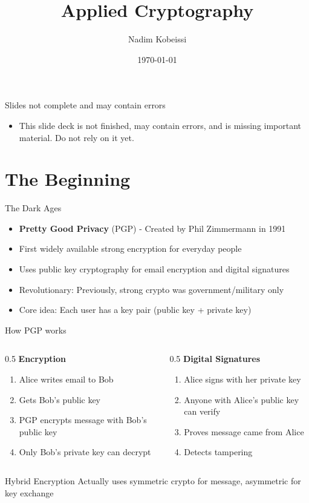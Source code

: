 \documentclass[aspectratio=169, lualatex, handout]{beamer}
\title{Applied Cryptography}
\author{Nadim Kobeissi}
\institute{American University of Beirut}
\date{\today}
\begin{document}
\begin{frame}[plain]
	\titlepage
\end{frame}

\begin{frame}{Slides not complete and may contain errors}
	\begin{itemize}
		\item This slide deck is not finished, may contain errors, and is missing important material. Do not rely on it yet.
	\end{itemize}
\end{frame}

\section{The Beginning}
\begin{frame}{The Dark Ages}
	\begin{itemize}
		\item \textbf{Pretty Good Privacy} (PGP) - Created by Phil Zimmermann in 1991
		\item First widely available strong encryption for everyday people
		\item Uses public key cryptography for email encryption and digital signatures
		\item Revolutionary: Previously, strong crypto was government/military only
		\item Core idea: Each user has a key pair (public key + private key)
	\end{itemize}
\end{frame}

\begin{frame}{How PGP works}
	\begin{columns}
		\begin{column}{0.5\textwidth}
			\textbf{Encryption}
			\begin{enumerate}
				\item Alice writes email to Bob
				\item Gets Bob's public key
				\item PGP encrypts message with Bob's public key
				\item Only Bob's private key can decrypt
			\end{enumerate}
		\end{column}
		\begin{column}{0.5\textwidth}
			\textbf{Digital Signatures}
			\begin{enumerate}
				\item Alice signs with her private key
				\item Anyone with Alice's public key can verify
				\item Proves message came from Alice
				\item Detects tampering
			\end{enumerate}
		\end{column}
	\end{columns}
	\begin{alertblock}{Hybrid Encryption}
		Actually uses symmetric crypto for message, asymmetric for key exchange
	\end{alertblock}
\end{frame}
\end{document}
